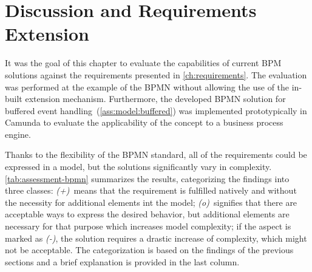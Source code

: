 \section{Discussion and Requirements Extension}\label{ch:ass:discussion}
It was the goal of this chapter to evaluate the capabilities of current \acs{BPM} solutions against the requirements presented in \autoref{ch:requirements}.
The evaluation was performed at the example of the \acs{BPMN} without allowing the use of the in-built extension mechanism. Furthermore, the developed BPMN solution for buffered event handling~(\autoref{ass:model:buffered}) was implemented prototypically in Camunda to evaluate the applicability of the concept to a business process engine. %

Thanks to the flexibility of the BPMN standard, all of the requirements could be expressed in a model, but the solutions significantly vary in complexity.
\autoref{tab:assessment-bpmn} summarizes the results, categorizing the findings into three classes: 
\textit{(+)}~means that the requirement is fulfilled natively and without the necessity for additional elements int the model; 
\textit{(o)}~signifies that there are acceptable ways to express the desired behavior, but additional elements are necessary for that purpose which increases model complexity; 
if the aspect is marked as \textit{(-)}, the solution requires a drastic increase of complexity, which might not be acceptable.
The categorization is based on the findings of the previous sections and a brief explanation is provided in the last column.


